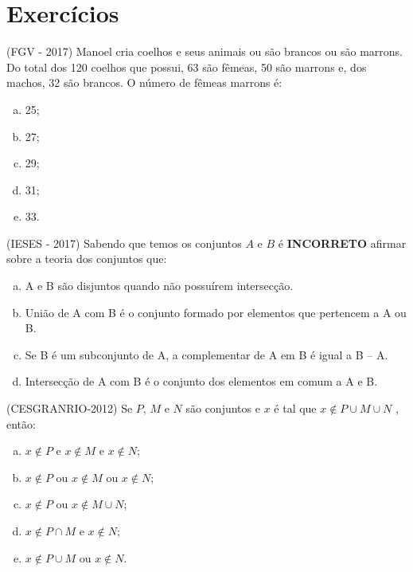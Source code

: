 \section{Exercícios}
\begin{exer}
  (FGV - 2017) Manoel cria coelhos e seus animais ou são brancos ou são marrons. Do total dos 120 coelhos que possui, 63 são fêmeas, 50 são marrons e, dos machos, 32 são brancos. O número de fêmeas marrons é:
  \begin{multicols}{5}
  \begin{enumerate}[a)]
  \item 25;
  \item 27;
  \item 29;
  \item 31;
  \item 33.
  \end{enumerate}
  \end{multicols}
\end{exer}

\begin{exer}
  (IESES - 2017)  Sabendo que temos os conjuntos $A$ e $B$ é \textbf{INCORRETO} afirmar sobre a teoria dos conjuntos que:
  \begin{enumerate}[a)]
  \item A e B são disjuntos quando não possuírem intersecção.
  \item União de A com B é o conjunto formado por elementos que pertencem a A ou B.
  \item Se B é um subconjunto de A, a complementar de A em B é igual a B – A.
  \item Intersecção de A com B é o conjunto dos elementos em comum a A e B.
  \end{enumerate}
\end{exer}

\begin{exer}
  (CESGRANRIO-2012) Se $P$, $M$ e $N$ são conjuntos e $x$ é tal que $x \notin P \cup M \cup N$ , então:
  \begin{enumerate}[a)]
  \item $x \notin P$  e $x  \notin M$  e $x \notin N$;
  \item $x \notin P$ ou $x \notin M$ ou $x \notin N$;
  \item $x \notin P$ ou $x \notin M \cup N$;
  \item $x \notin P \cap M$ e $x \notin N$;
  \item $x \notin P \cup M$ ou $x \notin N$.
  \end{enumerate}
\end{exer}

